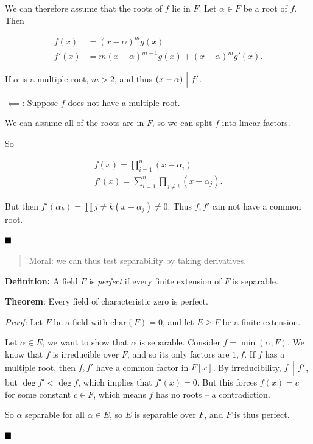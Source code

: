 We can therefore assume that the roots of \(f\) lie in \(F\). Let
\(\alpha\in F\) be a root of \(f\). Then

\begin{align*}
f(x)  &= (x-\alpha)^m g(x) \\
f'(x) &= m(x-\alpha)^{m-1} g(x) + (x-\alpha)^m g'(x)
.\end{align*}

If \(\alpha\) is a multiple root, \(m > 2\), and thus
\((x-\alpha) {~\Bigm| ~} f'\).

\(\impliedby\): Suppose \(f\) does not have a multiple root.

We can assume all of the roots are in \(F\), so we can split \(f\) into
linear factors.

So

\begin{align*}
f(x) = \prod_{i=1}^n (x-\alpha_i) \\
f'(x) = \sum_{i=1}^n \prod_{j\neq i} (x-\alpha_j)
.\end{align*}

But then \(f'(\alpha_k) = \prod{j\neq k} (x - \alpha_j) \neq 0\). Thus
\(f, f'\) can not have a common root.

\(\qed\)

\begin{quote}
Moral: we can thus test separability by taking derivatives.
\end{quote}

\textbf{Definition:} A field \(F\) is \emph{perfect} if every finite
extension of \(F\) is separable.

\textbf{Theorem}: Every field of characteristic zero is perfect.

\emph{Proof:} Let \(F\) be a field with \(\mathrm{char}(F) = 0\), and
let \(E \geq F\) be a finite extension.

Let \(\alpha \in E\), we want to show that \(\alpha\) is separable.
Consider \(f = \min(\alpha, F)\). We know that \(f\) is irreducible over
\(F\), and so its only factors are \(1, f\). If \(f\) has a multiple
root, then \(f, f'\) have a common factor in \(F[x]\). By
irreducibility, \(f {~\Bigm| ~} f'\), but \(\deg f' < \deg f\), which
implies that \(f'(x) = 0\). But this forces \(f(x) = c\) for some
constant \(c\in F\), which means \(f\) has no roots -- a contradiction.

So \(\alpha\) separable for all \(\alpha \in E\), so \(E\) is separable
over \(F\), and \(F\) is thus perfect.

\(\qed\)


